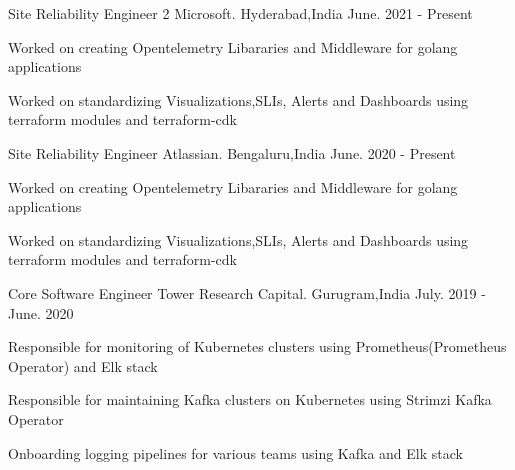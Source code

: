 

\begin{cventries}

    \cventry
    {Site Reliability Engineer 2} %
    {Microsoft.} %
    {Hyderabad,India} %
    {June. 2021 - Present} %
    {
      \begin{cvitems} %
               \item { Worked on creating Opentelemetry Libararies and Middleware for golang applications }
               \item { Worked on standardizing Visualizations,SLIs, Alerts and Dashboards using terraform modules and terraform-cdk} 		
	  \end{cvitems}
    }
    \cventry
    {Site Reliability Engineer} %
    {Atlassian.} %
    {Bengaluru,India} %
    {June. 2020 - Present} %
    {
      \begin{cvitems} %
               \item { Worked on creating Opentelemetry Libararies and Middleware for golang applications }
               \item { Worked on standardizing Visualizations,SLIs, Alerts and Dashboards using terraform modules and terraform-cdk} 		
	  \end{cvitems}
    }
    \cventry
    {Core Software Engineer} %
    {Tower Research Capital.} %
    {Gurugram,India} %
    {July. 2019 - June. 2020} %
    {
      \begin{cvitems} %
	    \item { Responsible for monitoring of  Kubernetes clusters using Prometheus(Prometheus Operator) and Elk stack }
               \item { Responsible for maintaining  Kafka clusters on Kubernetes using  Strimzi Kafka Operator }
               \item { Onboarding logging pipelines for various teams using Kafka and Elk stack }

\end{cvitems}}
\end{cventries}
